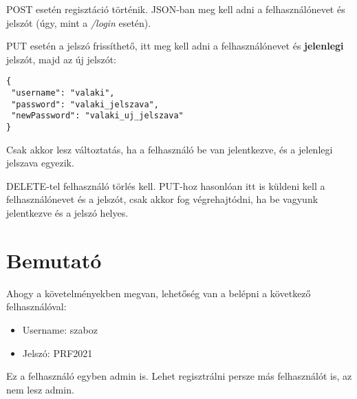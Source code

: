 \documentclass[]{article}
\begin{document}
POST esetén regisztáció történik. JSON-ban meg kell adni a felhasználónevet és jelszót (úgy, mint a \textit{/login} esetén).

PUT esetén a jelszó frissíthető, itt meg kell adni a felhasználónevet és \textbf{jelenlegi} jelszót, majd az új jelszót:

\bigskip
\begin{lstlisting}
{
 "username": "valaki",
 "password": "valaki_jelszava",
 "newPassword": "valaki_uj_jelszava"
}
\end{lstlisting}

Csak akkor lesz változtatás, ha a felhasználó be van jelentkezve, és a jelenlegi jelszava egyezik.

DELETE-tel felhasználó törlés kell. PUT-hoz hasonlóan itt is küldeni kell a felhasználónevet és a jelszót, csak akkor fog végrehajtódni, ha be vagyunk jelentkezve és a jelszó helyes.

\section{Bemutató}

Ahogy a követelményekben megvan, lehetőség van a belépni a következő felhasználóval:

\begin{itemize}
	\item Username: szaboz
	\item Jelszó: PRF2021
\end{itemize}

Ez a felhasználó egyben admin is. Lehet regisztrálni persze más felhasználót is, az nem lesz admin.
\end{document}
